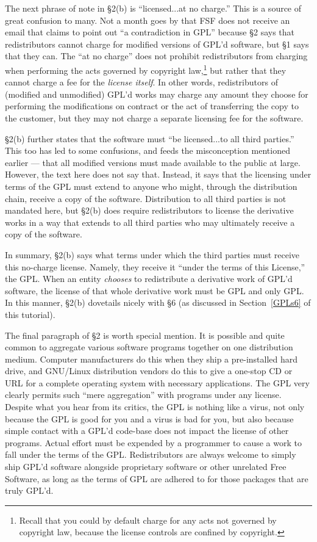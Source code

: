 \medskip

The next phrase of note in \S 2(b) is ``licensed...at no charge.''
This is a source of great confusion to many. Not a month goes by that
FSF does not receive an email that claims to point out ``a
contradiction in GPL'' because \S 2 says that redistributors cannot
charge for modified versions of GPL'd software, but \S 1 says that
they can. The ``at no charge'' does not prohibit redistributors from
charging when performing the acts governed by copyright
law,\footnote{Recall that you could by default charge for any acts not
governed by copyright law, because the license controls are confined
by copyright.} but rather that they cannot charge a fee for the
\emph{license itself}. In other words, redistributors of (modified
and unmodified) GPL'd works may charge any amount they choose for
performing the modifications on contract or the act of transferring
the copy to the customer, but they may not charge a separate licensing
fee for the software.

\S 2(b) further states that the software must ``be licensed...to all
third parties.''  This too has led to some confusions, and feeds the
misconception mentioned earlier --- that all modified versions must made
available to the public at large. However, the text here does not say
that. Instead, it says that the licensing under terms of the GPL must
extend to anyone who might, through the distribution chain, receive a copy
of the software. Distribution to all third parties is not mandated here,
but \S 2(b) does require redistributors to license the derivative works in
a way that extends to all third parties who may ultimately receive a
copy of the software.

In summary, \S 2(b) says what terms under which the third parties must
receive this no-charge license. Namely, they receive it ``under the terms
of this License,'' the GPL. When an entity \emph{chooses} to redistribute
a derivative work of GPL'd software, the license of that whole derivative
work must be GPL and only GPL\@. In this manner, \S 2(b) dovetails nicely
with \S 6 (as discussed in Section~\ref{GPLs6} of this tutorial).

\medskip

The final paragraph of \S 2 is worth special mention. It is possible and
quite common to aggregate various software programs together on one
distribution medium. Computer manufacturers do this when they ship a
pre-installed hard drive, and GNU/Linux distribution vendors do this to
give a one-stop CD or URL for a complete operating system with necessary
applications. The GPL very clearly permits such ``mere aggregation'' with
programs under any license. Despite what you hear from its critics, the
GPL is nothing like a virus, not only because the GPL is good for you and
a virus is bad for you, but also because simple contact with a GPL'd
code-base does not impact the license of other programs. Actual effort
must be expended by a programmer to cause a work to fall under the terms
of the GPL. Redistributors are always welcome to simply ship GPL'd
software alongside proprietary software or other unrelated Free Software,
as long as the terms of GPL are adhered to for those packages that are
truly GPL'd.

